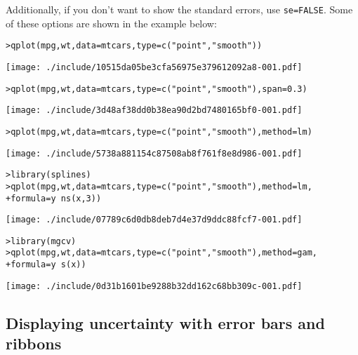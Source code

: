 Additionally, if you don't want to show the standard errors, use {\tt se=FALSE}.  Some of these options are shown in the example below:

\begin{alltt}
> qplot(mpg, wt, data = mtcars, type = c("point", "smooth"))
\end{alltt}
\texttt{[image: ./include/10515da05be3cfa56975e379612092a8-001.pdf]}
\begin{alltt}

> qplot(mpg, wt, data = mtcars, type = c("point", "smooth"), span = 0.3)
\end{alltt}
\texttt{[image: ./include/3d48af38dd0b38ea90d2bd7480165bf0-001.pdf]}
\begin{alltt}

> qplot(mpg, wt, data = mtcars, type = c("point", "smooth"), method = lm)
\end{alltt}
\texttt{[image: ./include/5738a881154c87508ab8f761f8e8d986-001.pdf]}
\begin{alltt}

> library(splines)
> qplot(mpg, wt, data = mtcars, type = c("point", "smooth"), method = lm, 
+     formula = y ~ ns(x, 3))
\end{alltt}
\texttt{[image: ./include/07789c6d0db8deb7d4e37d9ddc88fcf7-001.pdf]}
\begin{alltt}

> library(mgcv)
> qplot(mpg, wt, data = mtcars, type = c("point", "smooth"), method = gam, 
+     formula = y ~ s(x))
\end{alltt}
\texttt{[image: ./include/0d31b1601be9288b32dd162c68bb309c-001.pdf]}
\begin{alltt}

\end{alltt}%

\subsection{Displaying uncertainty with error bars and ribbons}\label{sub:error_bars}

